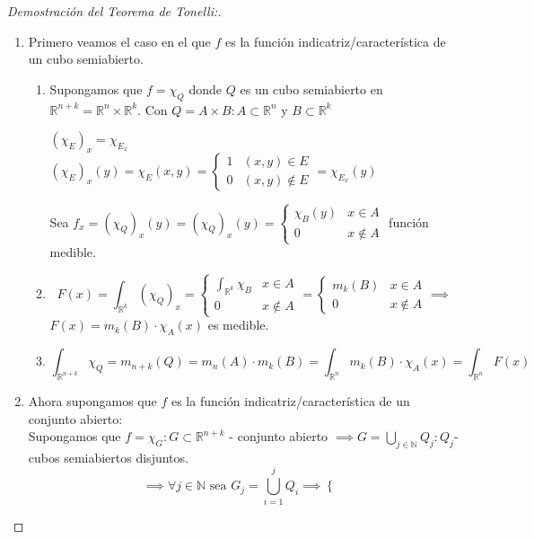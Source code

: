 \begin{proof}[Demostración del Teorema de Tonelli:]
    \leavevmode
    \begin{enumerate}
        \item Primero veamos el caso en el que $f$ es la función indicatriz/característica de un cubo semiabierto. 
        \begin{enumerate}
            \item Supongamos que $f = \chi_{Q}$ donde $Q$ es un cubo semiabierto en $\mathbb{R}^{n+k} = \mathbb{R}^n \times \mathbb{R}^k$. Con $Q = A \times B : A \subset \mathbb{R}^n$ y $B \subset \mathbb{R}^k$ \\ 
            \begin{observación}
                $(\chi_E)_x = \chi_{E_x}$
                $(\chi_E)_x(y) = \chi_E(x, y) = \begin{cases} 1 & (x, y) \in E \\ 0 & (x, y) \notin E \end{cases} = \chi_{E_x}(y)$
            \end{observación}
            Sea  $f_x = (\chi_Q)_x(y) = (\chi_Q)_x(y) = \begin{cases} \chi_B(y) & x \in A \\ 0 & x \notin A \end{cases}$  función medible. 
            \item $$F(x) = \int_{\mathbb{R}^k} (\chi_Q)_x = \begin{cases}
                \int_{\mathbb{R}^k}\chi_B & x \in A \\
                0 & x \notin A
            \end{cases} = \begin{cases}
                m_k(B) & x \in A \\
                0 & x \notin A
            \end{cases} \implies$$
            $F(x) = m_k(B) \cdot \chi_A(x)$ es medible.
            \item $$\int_{\mathbb{R}^{n+k}}\chi_Q = m_{n+k}(Q) = m_n(A) \cdot m_k(B) = \int_{\mathbb{R}^n}m_k(B) \cdot \chi_A(x) = \int_{\mathbb{R}^n}F(x)$$
        \end{enumerate}
        \item    Ahora supongamos que $f$ es la función indicatriz/característica de un conjunto abierto: \\
        Supongamos que $f = \chi_G : G \subset \mathbb{R}^{n+k}$ - conjunto abierto $\implies G = \bigcup_{j \in \mathbb{N}}Q_j : Q_j$-cubos semiabiertos disjuntos. $$\implies \forall j \in \mathbb{N} \text{ sea } G_j = \bigcup_{i = 1}^{j}Q_i \implies \begin{cases}

\end{cases}$$
\end{enumerate}
\end{proof}
